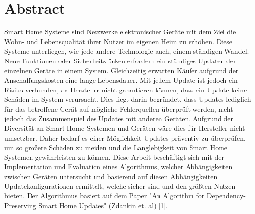 \chapter*{Abstract}






Smart Home Systeme sind Netzwerke elektronischer Geräte mit dem Ziel die Wohn- und Lebensqualität
ihrer Nutzer im eigenen Heim zu erhöhen.
Diese Systeme unterliegen, wie jede andere Technologie auch, einem ständigen Wandel. Neue Funktionen oder
Sicherheitslücken erfordern ein ständiges Updaten der einzelnen Geräte in einem System.
Gleichzeitig erwarten Käufer aufgrund der Anschaffungskosten
eine lange Lebensdauer. Mit jedem Update ist jedoch ein Risiko verbunden,
da Hersteller nicht garantieren können, dass ein Update keine Schäden im System verursacht.
Dies liegt darin begründet, dass Updates lediglich für das betroffene Gerät auf 
mögliche Fehlerquellen überprüft werden, nicht jedoch das Zusammenspiel des Updates mit anderen Geräten. 
Aufgrund der Diversität an Smart Home Systemen und Geräten wäre dies für Hersteller nicht umsetzbar.
Daher bedarf es einer Möglichkeit Updates präventiv zu überprüfen, um so größere Schäden zu meiden und 
die Langlebigkeit von Smart Home Systemen gewährleisten zu können.
Diese Arbeit beschäftigt sich mit der Implementation und Evaluation eines Algorithmus, welcher 
Abhängigkeiten zwischen Geräten untersucht und basierend auf diesen Abhängigkeiten Updatekonfigurationen 
ermittelt, welche sicher sind und den größten Nutzen bieten.
Der Algorithmus basiert auf dem Paper "An Algorithm for Dependency-Preserving
Smart Home Updates" (Zdankin et. al) [1].